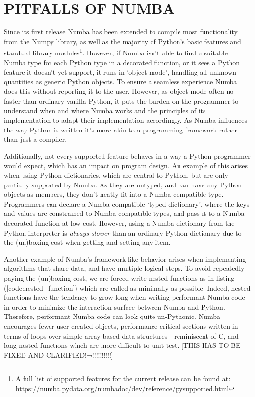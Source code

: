 \documentclass{IEEEcsmag}
\begin{document}


\section{PITFALLS OF NUMBA}\label{sec:pitfalls}

Since its first release Numba has been extended to compile most functionality from the Numpy library, as well as the majority of Python's basic features and standard library modules\footnote{A full list of supported features for the current release can be found at: https://numba.pydata.org/numba\-doc/dev/reference/pysupported.html}. However, if Numba isn't able to find a suitable Numba type for each Python type in a decorated function, or it sees a Python feature it doesn't yet support, it runs in `object mode', handling all unknown quantities as generic Python objects. To ensure a seamless experience Numba does this without reporting it to the user. However, as object mode often no faster than ordinary vanilla Python, it puts the burden on the programmer to understand when and where Numba works and the principles of its implementation to adapt their implementation accordingly. As Numba influences the way Python is written it's more akin to a programming framework rather than just a compiler.

Additionally, not every supported feature behaves in a way a Python programmer would expect, which has an impact on program design. An example of this arises when using Python dictionaries, which are central to Python, but are only partially supported by Numba. As they are untyped, and can have any Python objects as members, they don't neatly fit into a Numba compatible type. Programmers can declare a Numba compatible `typed dictionary', where the keys and values are constrained to Numba compatible types, and pass it to a Numba decorated function at low cost. However, using a Numba dictionary from the Python interpreter is \textit{always slower} than an ordinary Python dictionary due to the (un)boxing cost when getting and setting any item.

Another example of Numba's framework-like behavior arises when implementing algorithms that share data, and have multiple logical steps. To avoid repeatedly paying the (un)boxing cost, we are forced write nested functions as in listing (\ref{code:nested_function}) which are called as minimally as possible. Indeed, nested functions have the tendency to grow long when writing performant Numba code in order to minimize the interaction surface between Numba and Python. Therefore, performant Numba code can look quite un-Pythonic. Numba encourages fewer user created objects, performance critical sections written in terms of loops over simple array based data structures - reminiscent of C, and long nested functions which are more difficult to unit test. [THIS HAS TO BE FIXED AND CLARIFIED!¬!!!!!!!!!!]
\end{document}
